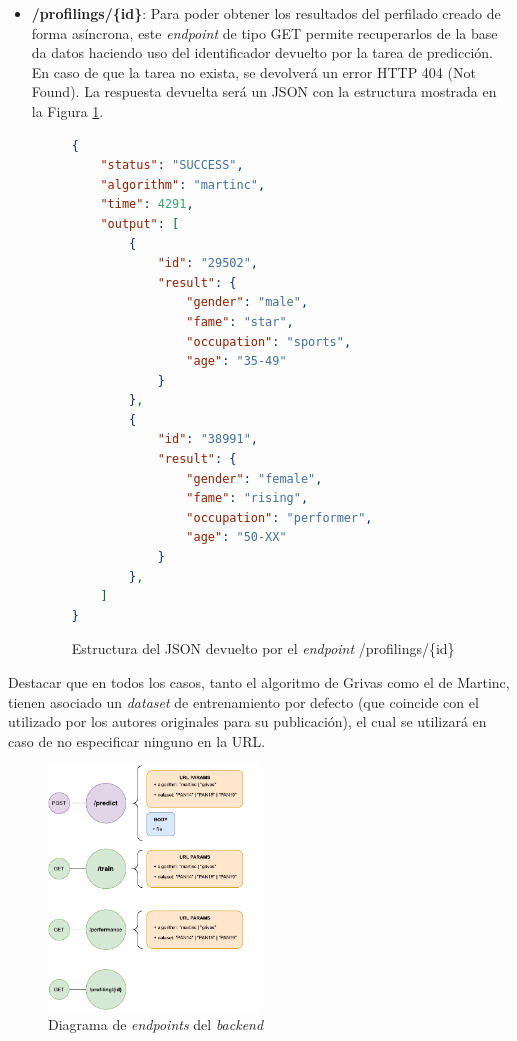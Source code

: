 \begin{itemize}
	\item \textbf{/profilings/\{id\}}: Para poder obtener los resultados del perfilado creado de forma asíncrona, este \textit{endpoint} de tipo GET
		permite recuperarlos de la base da datos haciendo uso del identificador devuelto por la tarea de predicción. En caso de que la tarea
		no exista, se devolverá un error HTTP 404 (Not Found). La respuesta devuelta será un JSON con la estructura mostrada en la Figura \ref{fig:profiling_json}.

		\begin{figure}[H]
			\begin{lstlisting}[language=json]
{
	"status": "SUCCESS",
	"algorithm": "martinc",
	"time": 4291,
	"output": [
		{
			"id": "29502",
			"result": {
				"gender": "male",
				"fame": "star",
				"occupation": "sports",
				"age": "35-49"
			}
		},
		{
			"id": "38991",
			"result": {
				"gender": "female",
				"fame": "rising",
				"occupation": "performer",
				"age": "50-XX"
			}
		},
	]
}\end{lstlisting}
			\caption{Estructura del JSON devuelto por el \textit{endpoint} /profilings/\{id\}}
			\label{fig:profiling_json}
		\end{figure}
\end{itemize}

Destacar que en todos los casos, tanto el algoritmo de Grivas como el de Martinc, tienen asociado un \textit{dataset} de entrenamiento por defecto (que coincide
con el utilizado por los autores originales para su publicación), el cual se utilizará en caso de no especificar ninguno en la URL.

\begin{figure}[H]
	\centering
	\includegraphics[width=0.5\textwidth]{diagramas/endpoints.pdf}
	\caption{Diagrama de \textit{endpoints} del \textit{backend}}
	\label{fig:implementacion_endpoints}
\end{figure}

